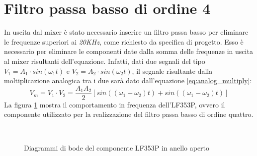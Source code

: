 \documentclass[titlepage]{report}
\begin{document}
	\label{ch:Risultati}
	

\newpage
\section{Filtro passa basso di ordine 4}
	In uscita dal mixer è stato necessario inserire un filtro passa basso per eliminare le frequenze superiori ai \textit{20KHz}, come richiesto da specifica di progetto. Esso è necessario per eliminare le componenti date dalla somma delle frequenze in uscita al mixer risultanti dell'equazione. Infatti, dati due segnali del tipo $ V_1 = A_1 \cdot sin(\omega_1t) $
	e $ V_2 = A_2 \cdot sin(\omega_2t) $, il segnale risultante dalla moltiplicazione analogica tra i due sarà dato dall'equazione \ref{eq:analog_multiply}:
	\begin{equation}
		V_m = V_1 \cdot V_2 = \frac{A_1A_2}{2}[sin((\omega_1 + \omega_2)t) + sin((\omega_1 - \omega_2)t)]
		\label{eq:analog_multiply}
	\end{equation}
	La figura \ref{fig:bode_LF353P} mostra il comportamento in frequenza dell'LF353P, ovvero il componente utilizzato per la realizzazione del filtro passa basso di ordine quattro.

	\begin{figure}[h]
		\centering
		 \qquad
		 \\
		\caption{Diagrammi di bode del componente LF353P in anello aperto}
		\label{fig:bode_LF353P}
	\end{figure}
\end{document}
